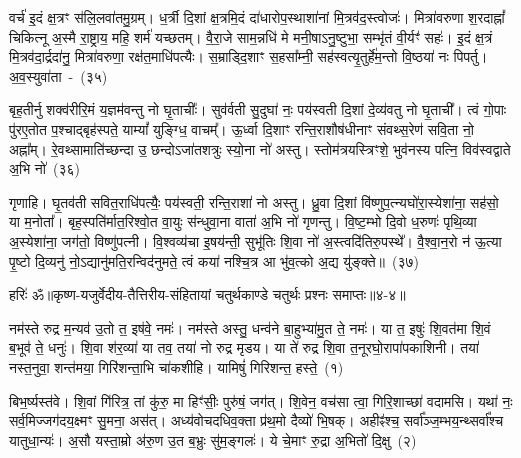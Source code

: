 वर्च॑ इ॒दं क्ष॒त्रꣳ स॑लि॒लवा॑तमु॒ग्रम्। ध॒र्त्री दि॒शां क्ष॒त्रमि॒दं दा॑धारोप॒स्थाशा॑नां मि॒त्रव॑द॒स्त्वोजः॑। मित्रा॑वरुणा श॒रदाह्नां᳚ चिकित्नू अ॒स्मै रा॒ष्ट्राय॒ महि॒ शर्म॑ यच्छतम्। वै॒रा॒जे साम॒न्नधि॑ मे मनी॒षाऽनु॒ष्टुभा॒ सम्भृ॑तं वी॒र्यꣳ॑ सहः॑। इ॒दं क्ष॒त्रं मि॒त्रव॑दा॒र्द्रदा॑नु॒ मित्रा॑वरुणा॒ रक्ष॑त॒माधि॑पत्यैः। स॒म्राड्दि॒शाꣳ स॒हसा᳚म्नी॒ सह॑स्वत्यृ॒तुर्\mbox{}हे॑म॒न्तो वि॒ष्ठया॑ नः पिपर्तु। अ॒व॒स्युवा॑ता~-~(३५)

बृह॒तीर्नु शक्व॑रीरि॒मं य॒ज्ञम॑वन्तु नो घृ॒ताचीः᳚। सुव॑र्वती सु॒दुघा॑ नः॒ पय॑स्वती दि॒शां दे॒व्य॑वतु नो घृ॒ताची᳚। त्वं गो॒पाः पु॑रए॒तोत प॒श्चाद्बृह॑स्पते॒ याम्यां᳚ युङ्ग्धि॒ वाचम्᳚। ऊ॒र्ध्वा दि॒शाꣳ रन्ति॒राशौष॑धीनाꣳ संवथ्स॒रेण॑ सवि॒ता नो॒ अह्ना᳚म्। रे॒वथ्सामाति॑च्छन्दा उ॒ छन्दोऽजा॑तशत्रुः स्यो॒ना नो॑ अस्तु। स्तोम॑त्रयस्त्रिꣳशे॒ भुव॑नस्य पत्नि॒ विव॑स्वद्वाते अ॒भि नो॑~(३६)

गृणाहि। घृ॒तव॑ती सवित॒राधि॑पत्यैः॒ पय॑स्वती॒ रन्ति॒राशा॑ नो अस्तु। ध्रु॒वा दि॒शां वि॑ष्णुप॒त्न्यघो॑रा॒स्येशा॑ना॒ सह॑सो॒ या म॒नोता᳚। बृह॒स्पति॑र्मात॒रिश्वो॒त वा॒युः स॑न्धुवा॒ना वाता॑ अ॒भि नो॑ गृणन्तु। वि॒ष्ट॒म्भो दि॒वो ध॒रुणः॑ पृथि॒व्या अ॒स्येशा॑ना॒ जग॑तो॒ विष्णु॑पत्नी। वि॒श्वव्य॑चा इ॒षय॑न्ती॒ सुभू॑तिः शि॒वा नो॑ अ॒स्त्वदि॑तिरु॒पस्थे᳚। वै॒श्वा॒न॒रो न॑ ऊ॒त्या पृ॒ष्टो दि॒व्यनु॑ नो॒\-ऽद्यानु॑मति॒रन्विद॑नुमते॒ त्वं कया॑ नश्चि॒त्र आ भु॑व॒त्को अ॒द्य यु॑ङ्क्ते॥~(३७)

{\anuvakamend[{महि॑ सप्तद॒शेना॑व॒स्युवा॑ता अ॒भि नो\-ऽनु॑ न॒श्चतु॑र्दश च}]}%

{हरिः॑ ॐ}{॥कृष्ण-यजुर्वेदीय-तैत्तिरीय-संहितायां चतुर्थकाण्डे चतुर्थः प्रश्नः समाप्तः॥४-४॥}

\setcounter{anuvakam}{0}
नम॑स्ते रुद्र म॒न्यव॑ उ॒तो त॒ इष॑वे॒ नमः॑। नम॑स्ते अस्तु॒ धन्व॑ने बा॒हुभ्या॑मु॒त ते॒ नमः॑। या त॒ इषुः॑ शि॒वत॑मा शि॒वं ब॒भूव॑ ते॒ धनुः॑। शि॒वा श॑र॒व्या॑ या तव॒ तया॑ नो रुद्र मृडय। या ते॑ रुद्र शि॒वा त॒नूरघो॒रापा॑पकाशिनी। तया॑ नस्त॒नुवा॒ शन्त॑मया॒ गिरि॑शन्ता॒भि चा॑कशीहि। यामिषुं॑ गिरिशन्त॒ हस्ते॒~(१)

बिभ॒र्ष्यस्त॑वे। शि॒वां गि॑रित्र॒ तां कु॑रु॒ मा हिꣳ॑सीः॒ पुरु॑षं॒ जग॑त्। शि॒वेन॒ वच॑सा त्वा॒ गिरि॒शाच्छा॑ वदामसि। यथा॑ नः॒ सर्व॒मिज्जग॑दय॒क्ष्मꣳ सु॒मना॒ अस॑त्। अध्य॑वोचदधिव॒क्ता प्र॑थ॒मो दैव्यो॑ भि॒षक्। अहीꣴ॑श्च॒ सर्वा᳚ञ्ज॒म्भय॒न्थ्सर्वा᳚श्च यातुधा॒न्यः॑। अ॒सौ यस्ता॒म्रो अ॑रु॒ण उ॒त ब॒भ्रुः सु॑म॒ङ्गलः॑। ये चे॒माꣳ रु॒द्रा अ॒भितो॑ दि॒क्षु~(२)

